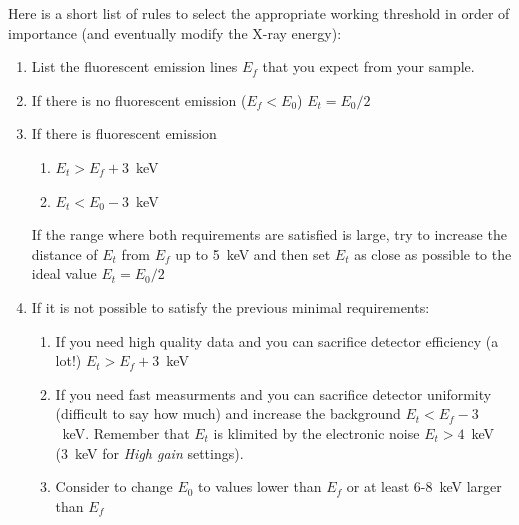 Here is a short list of rules to select the appropriate working threshold in order of importance (and eventually modify the X-ray energy):
\begin{enumerate}
\item List the fluorescent emission lines $E_f$ that you expect from your sample. 
\item If there is no fluorescent emission ($E_f<E_0$) $E_t=E_0/2$
\item If there is fluorescent emission 
\begin{enumerate}
\item $E_t>E_f+3$~keV
\item $E_t<E_0-3$~keV 
\end{enumerate}
If the range where both requirements are satisfied is large, try to increase the distance of $E_t$ from $E_f$ up to 5~keV and then set $E_t$ as close as possible to the ideal value $E_t=E_0/2$
\item If it is not possible to satisfy the previous minimal requirements:
\begin{enumerate}
\item If you need high quality data and you can sacrifice detector efficiency (a lot!)  $E_t>E_f+3$~keV
\item If you need fast measurments and you can sacrifice detector uniformity (difficult to say how much) and increase the background $E_t<E_f-3$~keV. Remember that $E_t$ is klimited by the electronic noise $E_t>4$~keV (3~keV for \textit{High gain} settings).
\item Consider to change $E_0$ to values lower than $E_f$ or at least 6-8~keV larger than $E_f$ 
\end{enumerate}
\end{enumerate}



